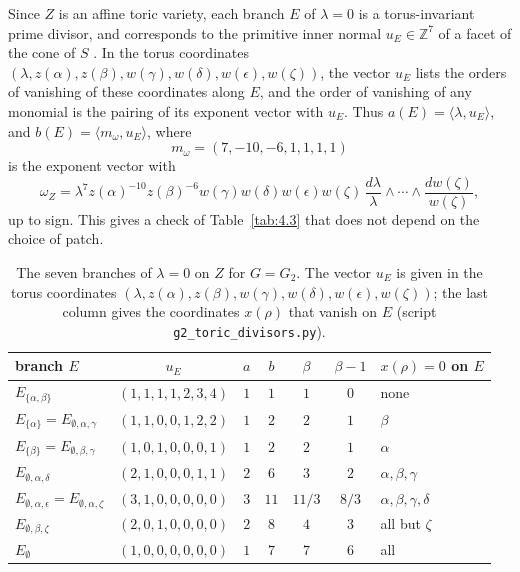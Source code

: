 \documentclass[12pt,letterpaper]{amsart}
\theoremstyle{plain}
\theoremstyle{definition}
\theoremstyle{remark}
\theoremstyle{definition}
\newcommand{\zzz}{\mathbb{Z}}
\begin{document}
Since $Z$ is an affine toric variety, each branch $E$ of $\lambda=0$ is a
torus-invariant prime divisor, and corresponds to the primitive inner normal
$u_E\in\zzz^7$ of a facet of the cone of $S$ \cite[Ch.~I]{Ke72}. In the torus
coordinates $(\lambda,z(\alpha),z(\beta),w(\gamma),w(\delta),w(\epsilon),
w(\zeta))$, the vector $u_E$ lists the orders of vanishing of these
coordinates along $E$, and the order of vanishing of any monomial is the
pairing of its exponent vector with $u_E$. Thus $a(E)=\langle
\lambda,u_E\rangle$, and $b(E)=\langle m_\omega,u_E\rangle$, where
\[
m_\omega=(7,-10,-6,1,1,1,1)
\]
is the exponent vector with
\[
\omega_{Z}=\lambda^{7}z(\alpha)^{-10}z(\beta)^{-6}w(\gamma)w(\delta)
w(\epsilon)w(\zeta)\,\frac{d\lambda}{\lambda}\wedge\cdots\wedge
\frac{dw(\zeta)}{w(\zeta)},
\]
up to sign. This gives a check of
Table~\ref{tab:4.3} that does not depend on the choice of patch.

\begin{table}[ht]
\renewcommand{\thetable}{4.3A}\caption{The seven branches of $\lambda=0$ on $Z$ for $G=G_2$.
The vector $u_E$ is given in the torus coordinates
$(\lambda,z(\alpha),z(\beta),w(\gamma),w(\delta),w(\epsilon),w(\zeta))$;
the last column gives the coordinates $x(\rho)$ that vanish on $E$
(script \texttt{g2\_toric\_divisors.py}).}\label{tab:4.3A}
\renewcommand{\arraystretch}{1.15}
\begin{tabular}{@{}lcccccl@{}}
\toprule
branch $E$ & $u_E$ & $a$ & $b$ & $\beta$ & $\beta-1$ & $x(\rho)=0$ on $E$\\
\midrule
$E_{\{\alpha,\beta\}}$ & $(1,1,1,1,2,3,4)$ & $1$ & $1$ & $1$ & $0$ & none\\
$E_{\{\alpha\}}=E_{\emptyset,\alpha,\gamma}$ & $(1,1,0,0,1,2,2)$ & $1$ & $2$ & $2$ & $1$ & $\beta$\\
$E_{\{\beta\}}=E_{\emptyset,\beta,\gamma}$ & $(1,0,1,0,0,0,1)$ & $1$ & $2$ & $2$ & $1$ & $\alpha$\\
$E_{\emptyset,\alpha,\delta}$ & $(2,1,0,0,0,1,1)$ & $2$ & $6$ & $3$ & $2$ & $\alpha,\beta,\gamma$\\
$E_{\emptyset,\alpha,\epsilon}=E_{\emptyset,\alpha,\zeta}$ & $(3,1,0,0,0,0,0)$ & $3$ & $11$ & $11/3$ & $8/3$ & $\alpha,\beta,\gamma,\delta$\\
$E_{\emptyset,\beta,\zeta}$ & $(2,0,1,0,0,0,0)$ & $2$ & $8$ & $4$ & $3$ & all but $\zeta$\\
$E_{\emptyset}$ & $(1,0,0,0,0,0,0)$ & $1$ & $7$ & $7$ & $6$ & all\\
\bottomrule
\end{tabular}
\end{table}
\end{document}

